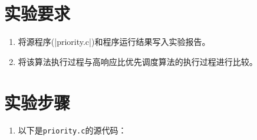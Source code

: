 \documentclass[c5size,a4paper,nofonts]{ctexart}
\begin{document}
\section{实验要求}
\begin{enumerate}[label={(\arabic*)}]
\item 将源程序(|priority.c|)和程序运行结果写入实验报告。
\item 将该算法执行过程与高响应比优先调度算法的执行过程进行比较。
\end{enumerate}

\section{实验步骤}

\begin{enumerate}

\item 以下是{\tt priority.c}的源代码：

% 


\begin{figure}[htp]
\end{figure}

\end{enumerate}
\end{document}
